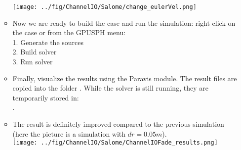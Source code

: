 \documentclass{../GPUSPHtemplate}
\begin{document}
\begin{enumerate}
\begin{itemize}
    \texttt{[image: ../fig/ChannelIO/Salome/change\_eulerVel.png]}\medskip
  \item Now we are ready to build the case and run the simulation: right click on the case or from the GPUSPH menu:\\
    1. Generate the sources\\
    2. Build solver\\
    3. Run solver
  \item Finally, visualize the results using the Paravis module. The result files are copied into the folder
    . While the solver is still running, they are temporarily stored in:\\
    .
  \item The result is definitely improved compared to the previous simulation (here the picture is a simulation with
    $dr = 0.05m$).\smallskip\\
    \texttt{[image: ../fig/ChannelIO/Salome/ChannelIOFade\_results.png]}\medskip\\
  \end{itemize}
\end{enumerate}

  

\end{document}
